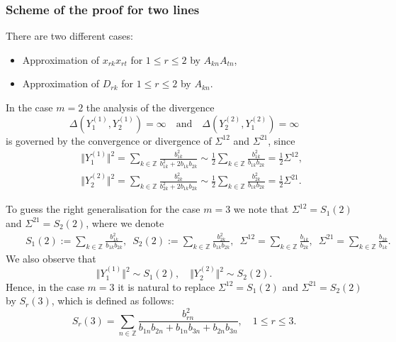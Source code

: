 \documentclass[preprint,12pt]{elsarticle}
\newcommand{\commA}[1]{\marginpar{%
\begin{color}{red}
\vskip-\baselineskip %
\raggedright\footnotesize
\itshape\hrule \smallskip A: #1\par\smallskip\hrule\end{color}}}
\numberwithin{equation}{section}
\begin{document}
\subsubsection{Scheme of the proof for two lines}
%

There are two different cases: 
\begin{itemize}
	\item[${\rm I.}$] Approximation of $x_{rk}x_{rt}$ for $1\leq r\leq 2$ by $A_{kn}A_{tn}$,
    \item[${\rm II.}$]  Approximation of $D_{rk}$ for $1\leq r\leq 2$  by $A_{kn}$.   
\end{itemize}
%
In the case $m=2$ the analysis of the divergence
$$
\Delta(Y_1^{(1)},Y_2^{(1)})=\infty\quad \text{and} \quad \Delta(Y_2^{(2)},Y_1^{(2)})=\infty
$$ 
is governed by the 
convergence or divergence
of 
$\Sigma^{12}$ and $\Sigma^{21}$, since 
\begin{eqnarray*}
&&\Vert Y_1^{(1)} \Vert^2=\sum_{k\in \mathbb Z}\frac{b_{1k}^2}{b_{1k}^2+2b_{1k}b_{2k}}\sim \frac{1}{2}\sum_{k\in \mathbb Z}\frac{b_{1k}^2}{b_{1k}b_{2k}}=
\frac{1}{2}\Sigma^{12},\\
&&\Vert Y_2^{(2)}\Vert^2=\sum_{k\in \mathbb Z}\frac{b_{2k}^2}{b_{2k}^2+2b_{1k}b_{2k}}\sim \frac{1}{2}\sum_{k\in \mathbb Z}\frac{b_{2k}^2}{b_{1k}b_{2k}}
=\frac{1}{2}\Sigma^{21}.
\end{eqnarray*}
%
%
\begin{rem}
\label{S_r(2)}
To guess the right generalisation for the case $m=3$ we note that $\Sigma^{12}=S_1(2)$ and $\Sigma^{21}=S_2(2)$, where  we denote
%
\begin{eqnarray*}
&& S_1(2):=\sum_{k\in \mathbb Z}\frac{b_{1k}^2}{b_{1k}b_{2k}},\,\,\,
S_2(2):=\sum_{k\in \mathbb Z}\frac{b_{2k}^2}{b_{1k}b_{2k}},\,\,\,\Sigma^{12}=\sum_{k\in \mathbb Z}\frac{b_{1k}}{b_{2k}},\,\,\,
\Sigma^{21}=\sum_{k\in \mathbb Z}\frac{b_{2k}}{b_{1k}}.
 \end{eqnarray*}
 We also observe that
\begin{equation}
  \label{Y_r(s)-S_r(3).m=2} 
\Vert Y_1^{(1)} \Vert^2\sim S_1(2),\quad  \Vert Y_2^{(2)} \Vert^2\sim S_2(2).
\end{equation}
Hence, in the case  $m=3$ it is natural to replace  $\Sigma^{12}=S_1(2)$ and $\Sigma^{21}=S_2(2)$ by   
$S_r(3)$, which is  defined as follows:
\begin{equation}
\label{S_r(3)}
 S_r(3)=\sum_{n\in \mathbb Z}\frac{b_{rn}^2}{b_{1n}b_{2n}+b_{1n}b_{3n}+b_{2n}b_{3n}},\quad 1\leq r\leq 3.
\end{equation}
\end{rem}
%
%
\end{document}
